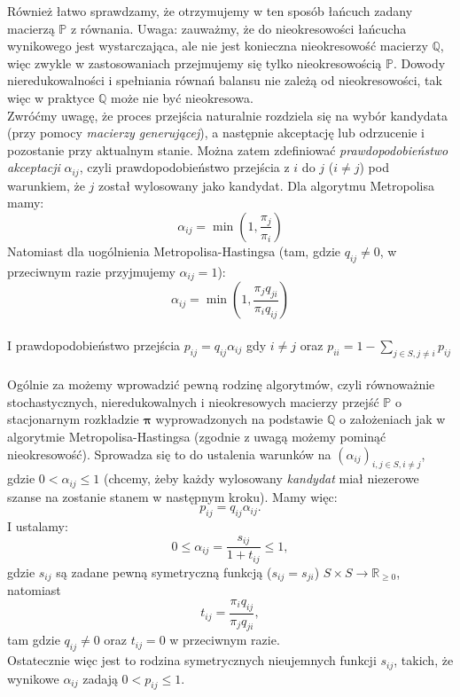 \documentclass[a4paper]{article}
\theoremstyle{defn}
\theoremstyle{theorem}
\theoremstyle{lemma}
\theoremstyle{cor}
\theoremstyle{fact}
\begin{document}
Również łatwo sprawdzamy, że otrzymujemy w ten sposób łańcuch zadany macierzą $\mathbb{P}$ z równania. Uwaga: zauważmy, że do nieokresowości łańcucha wynikowego jest wystarczająca, ale nie jest konieczna nieokresowość macierzy $\mathbb{Q}$, więc zwykle w zastosowaniach przejmujemy się tylko nieokresowością $\mathbb{P}$. Dowody nieredukowalności i spełniania równań balansu nie zależą od nieokresowości, tak więc w praktyce $\mathbb{Q}$ może nie być nieokresowa. \\
Zwróćmy uwagę, że proces przejścia naturalnie rozdziela się na wybór kandydata (przy pomocy \textit{macierzy generującej}), a następnie akceptację lub odrzucenie i pozostanie przy aktualnym stanie. Można zatem zdefiniować \textit{prawdopodobieństwo akceptacji} $\alpha_{ij}$, czyli prawdopodobieństwo przejścia z $i$ do $j$ ($i \neq j$) pod warunkiem, że $j$ został wylosowany jako kandydat. Dla algorytmu Metropolisa mamy:
$$\alpha_{ij} = \min(1, \frac{\pi_j}{\pi_i})$$
Natomiast dla uogólnienia Metropolisa-Hastingsa (tam, gdzie $q_{ij} \neq 0$, w przeciwnym razie przyjmujemy $\alpha_{ij} = 1$):
$$\alpha_{ij} = \min(1, \frac{\pi_j q_{ji}}{\pi_i q_{ij}})$$
\\
I prawdopodobieństwo przejścia $p_{ij} = q_{ij}\alpha_{ij}$ gdy $i \neq j$ oraz $p_{ii} = 1 - \sum\limits_{j \in S, j \neq i} p_{ij}$\\\\
Ogólnie za \cite{hastings} możemy wprowadzić pewną rodzinę algorytmów, czyli równoważnie stochastycznych, nieredukowalnych i nieokresowych macierzy przejść $\mathbb{P}$ o stacjonarnym rozkładzie $\boldsymbol{\pi}$ wyprowadzonych na podstawie $\mathbb{Q}$ o założeniach jak w algorytmie Metropolisa-Hastingsa (zgodnie z uwagą możemy pominąć nieokresowość). Sprowadza się to do ustalenia warunków na $(\alpha_{ij})_{i,j \in S, i \neq j}$, gdzie $0 < \alpha_{ij} \leq 1$ (chcemy, żeby każdy wylosowany \textit{kandydat} miał niezerowe szanse na zostanie stanem w następnym kroku). Mamy więc:  $$p_{ij} = q_{ij}\alpha_{ij}.$$
I ustalamy:
$$ 0 \leq \alpha_{ij} = \frac{s_{ij}}{1+t_{ij}} \leq 1,$$
gdzie  $s_{ij}$ są zadane pewną symetryczną funkcją ($s_{ij} = s_{ji}$) $S \times S \to \mathbb{R}_{\geq 0}$, natomiast $$t_{ij} = \frac{\pi_i q_{ij}}{\pi_j q_{ji}},$$
tam gdzie $q_{ij} \neq 0$ oraz $t_{ij} = 0$ w przeciwnym razie.\\

Ostatecznie więc jest to rodzina symetrycznych nieujemnych funkcji $s_{ij}$, takich, że wynikowe $\alpha_{ij}$ zadają $0 < p_{ij} \leq 1$.\\
\end{document}
